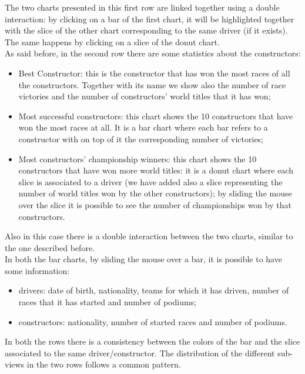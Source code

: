 \documentclass[11pt,twocolumn,letterpaper]{article}
\begin{document}
The two charts presented in this first row are linked together using a double interaction: by clicking on a bar of the first chart, it will be highlighted together with the slice of the other chart corresponding to the same driver (if it exists). The same happens by clicking on a slice of the donut chart.\\
As said before, in the second row there are some statistics about the constructors:
\begin{itemize}
	\item Best Constructor: this is the constructor that has won the most races of all the constructors. Together with its name we show also the number of race victories and the number of constructors' world titles that it has won;
	\item Most successful constructors: this chart shows the 10 constructors that have won the most races at all. It is a bar chart where each bar refers to a constructor with on top of it the corresponding number of victories;
	\item Most constructors' championship winners: this chart shows the 10 constructors that have won more world titles: it is a donut chart where each slice is associated to a driver (we have added also a slice representing the number of world titles won by the other constructors); by sliding the mouse over the slice it is possible to see the number of championships won by that constructors.
\end{itemize}
Also in this case there is a double interaction between the two charts, similar to the one described before.\\
In both the bar charts, by sliding the mouse over a bar, it is possible to have some information:
\begin{itemize}
	\item drivers: date of birth, nationality, teams for which it has driven, number of races that it has started and number of podiums;
	\item constructors: nationality, number of started races and number of podiums.
\end{itemize}
In both the rows there is a consistency between the colors of the bar and the slice associated to the same driver/constructor. The distribution of the different sub-views in the two rows follows a common pattern.
\end{document}
